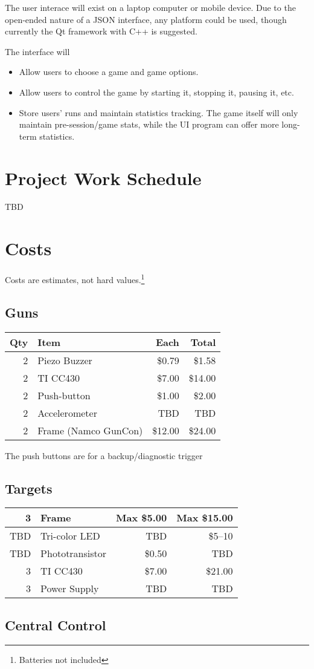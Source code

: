 \documentclass{article}
\begin{document}
The user interace will exist on a laptop computer or mobile device.
Due to the open-ended nature of a JSON interface, any platform could be used, though currently the Qt framework
with C++ is suggested.

The interface will
\begin{itemize}
\item Allow users to choose a game and game options.
\item Allow users to control the game by starting it, stopping it, pausing it, etc.
\item Store users' runs and maintain statistics tracking. The game itself will only maintain pre-session/game stats,
	while the UI program can offer more long-term statistics.
\end{itemize}

\section{Project Work Schedule}

TBD

\section{Costs}

Costs are estimates, not hard values.\footnote{Batteries not included}

\subsection{Guns}

\begin{tabular}{|r|l|r|r|}
\hline
Qty & Item & Each & Total \\
\hline
2 & Piezo Buzzer & \$0.79 & \$1.58 \\
\hline
2 & TI CC430 & \$7.00 & \$14.00 \\
\hline
2 & Push-button & \$1.00 & \$2.00 \\
\hline
2 & Accelerometer & TBD & TBD \\
\hline
2 & Frame (Namco GunCon) & \$12.00 & \$24.00 \\
\hline
\end{tabular}

The push buttons are for a backup/diagnostic trigger

\subsection{Targets}

\begin{tabular}{|r|l|r|r|}
\hline
3 & Frame & Max \$5.00 & Max \$15.00 \\
\hline
TBD & Tri-color LED & TBD & \$5--10 \\
\hline
TBD & Phototransistor & \$0.50 & TBD \\
\hline
3 & TI CC430 & \$7.00 & \$21.00 \\
\hline
3 & Power Supply & TBD & TBD \\
\hline
\end{tabular}

\subsection{Central Control}
\end{document}
